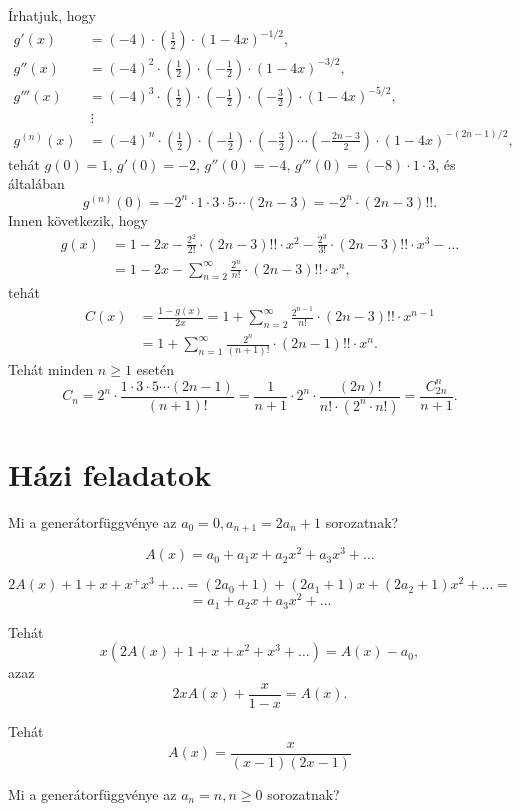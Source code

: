 \begin{solution}
Írhatjuk, hogy 
\begin{align*}
g'(x) & =(-4)\cdot\left(\frac{1}{2}\right)\cdot(1-4x)^{-1/2},\\
g''(x) & =(-4)^{2}\cdot\left(\frac{1}{2}\right)\cdot\left(-\frac{1}{2}\right)\cdot(1-4x)^{-3/2},\\
g'''(x) & =(-4)^{3}\cdot\left(\frac{1}{2}\right)\cdot\left(-\frac{1}{2}\right)\cdot\left(-\frac{3}{2}\right)\cdot(1-4x)^{-5/2},\\
 & \ \vdots\\
g^{(n)}(x) & =(-4)^{n}\cdot\left(\frac{1}{2}\right)\cdot\left(-\frac{1}{2}\right)\cdot\left(-\frac{3}{2}\right)\cdots\left(-\frac{2n-3}{2}\right)\cdot(1-4x)^{-(2n-1)/2},
\end{align*}
tehát $g(0)=1$, $g'(0)=-2$, $g''(0)=-4$, $g'''(0)=(-8)\cdot1\cdot3$,
és általában 
\[
g^{(n)}(0)=-2^{n}\cdot1\cdot3\cdot5\cdots(2n-3)=-2^{n}\cdot(2n-3)!!.
\]
Innen következik, hogy 
\begin{align*}
g(x) & =1-2x-\frac{2^{2}}{2!}\cdot(2n-3)!!\cdot x^{2}-\frac{2^{3}}{3!}\cdot(2n-3)!!\cdot x^{3}-\ldots\\
 & =1-2x-\sum_{n=2}^{\infty}\frac{2^{n}}{n!}\cdot(2n-3)!!\cdot x^{n},
\end{align*}
tehát 
\begin{align*}
C(x) & =\frac{1-g(x)}{2x}=1+\sum_{n=2}^{\infty}\frac{2^{n-1}}{n!}\cdot(2n-3)!!\cdot x^{n-1}\\
 & =1+\sum_{n=1}^{\infty}\frac{2^{n}}{(n+1)!}\cdot(2n-1)!!\cdot x^{n}.
\end{align*}
Tehát minden $n\ge1$ esetén 
\[
C_{n}=2^{n}\cdot\frac{1\cdot3\cdot5\cdots(2n-1)}{(n+1)!}=\frac{1}{n+1}\cdot2^{n}\cdot\frac{(2n)!}{n!\cdot(2^{n}\cdot n!)}=\frac{C_{2n}^{n}}{n+1}.
\]
\end{solution}

\section*{Házi feladatok}
\begin{problem}
Mi a generátorfüggvénye az $a_{0}=0,a_{n+1}=2a_{n}+1$ sorozatnak? 
\end{problem}

\begin{solution}
\[
A(x)=a_{0}+a_{1}x+a_{2}x^{2}+a_{3}x^{3}+\dots
\]

\[
2A(x)+1+x+x^{+}x^{3}+\dots=(2a_{0}+1)+(2a_{1}+1)x+(2a_{2}+1)x^{2}+\dots=
\]
\[
=a_{1}+a_{2}x+a_{3}x^{2}+\dots
\]

Tehát 
\[
x(2A(x)+1+x+x^{2}+x^{3}+\dots)=A(x)-a_{0},
\]
azaz 
\[
2xA(x)+\dfrac{x}{1-x}=A(x).
\]

Tehát 
\[
A(x)=\dfrac{x}{(x-1)(2x-1)}
\]
\end{solution}
\begin{problem}
Mi a generátorfüggvénye az $a_{n}=n,n\geq0$ sorozatnak? 
\end{problem}

